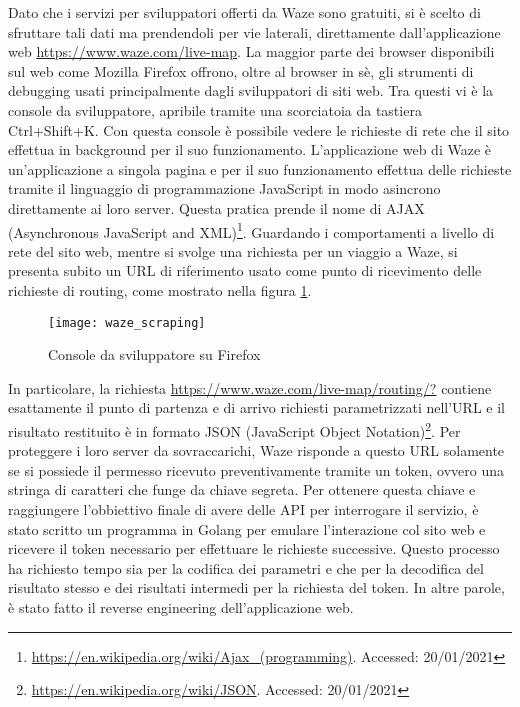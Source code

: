 Dato che i servizi per sviluppatori offerti da Waze sono gratuiti, si è scelto di sfruttare tali dati ma prendendoli per vie laterali, direttamente dall'applicazione web \url{https://www.waze.com/live-map}. La maggior parte dei browser disponibili sul web come Mozilla Firefox offrono, oltre al browser in sè, gli strumenti di debugging usati principalmente dagli sviluppatori di siti web. Tra questi vi è la console da sviluppatore, apribile tramite una scorciatoia da tastiera Ctrl+Shift+K. Con questa console è possibile vedere le richieste di rete che il sito effettua in background per il suo funzionamento. L'applicazione web di Waze è un'applicazione a singola pagina e per il suo funzionamento effettua delle richieste tramite il linguaggio di programmazione JavaScript in modo asincrono direttamente ai loro server. Questa pratica prende il nome di AJAX (Asynchronous JavaScript and XML)\footnote{\url{https://en.wikipedia.org/wiki/Ajax_(programming)}. Accessed: 20/01/2021}. Guardando i comportamenti a livello di rete del sito web, mentre si svolge una richiesta per un viaggio a Waze, si presenta subito un URL di riferimento usato come punto di ricevimento delle richieste di routing, come mostrato nella figura \ref{image:1}.

\begin{figure}[H]
	\texttt{[image: waze\_scraping]}
	\caption{Console da sviluppatore su Firefox}
	\label{image:1}
\end{figure}

In particolare, la richiesta \url{https://www.waze.com/live-map/routing/?} contiene esattamente il punto di partenza e di arrivo richiesti parametrizzati nell'URL e il risultato restituito è in formato JSON (JavaScript Object Notation)\footnote{\url{https://en.wikipedia.org/wiki/JSON}. Accessed: 20/01/2021}. Per proteggere i loro server da sovraccarichi, Waze risponde a questo URL solamente se si possiede il permesso ricevuto preventivamente tramite un token, ovvero una stringa di caratteri che funge da chiave segreta. Per ottenere questa chiave e raggiungere l'obbiettivo finale di avere delle API per interrogare il servizio, è stato scritto un programma in Golang per emulare l'interazione col sito web e ricevere il token necessario per effettuare le richieste successive. Questo processo ha richiesto tempo sia per la codifica dei parametri e che per la decodifica del risultato stesso e dei risultati intermedi per la richiesta del token. In altre parole, è stato fatto il reverse engineering dell'applicazione web.


